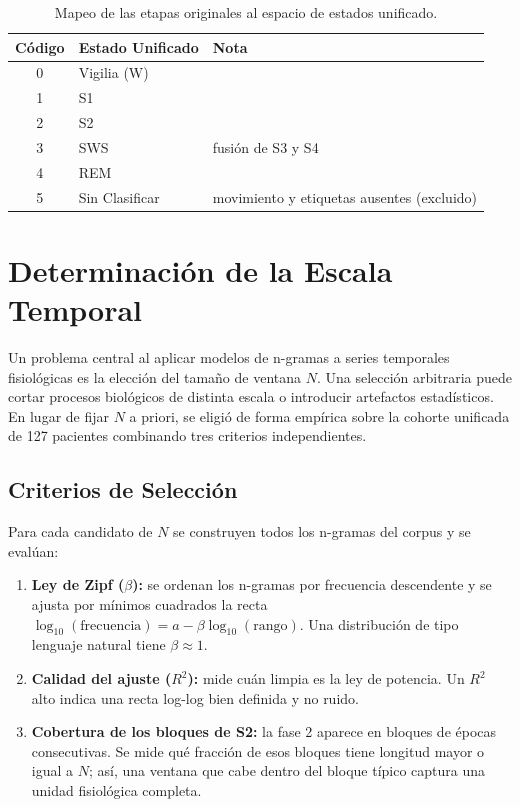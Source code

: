 \begin{table}[htbp]
\centering
\caption{Mapeo de las etapas originales al espacio de estados unificado.}
\label{tab:codificacion_simplificada}
\small\setlength{\tabcolsep}{5pt}%
\begin{tabular}{cll}
\hline
\textbf{Código} & \textbf{Estado Unificado} & \textbf{Nota} \\
\hline
0 & Vigilia (W) & \\
1 & S1 & \\
2 & S2 & \\
3 & SWS & fusión de S3 y S4 \\
4 & REM & \\
5 & Sin Clasificar & movimiento y etiquetas ausentes (excluido) \\
\hline
\end{tabular}
\end{table}

\section{Determinación de la Escala Temporal}

Un problema central al aplicar modelos de n-gramas a series temporales fisiológicas es la elección del tamaño de ventana $N$. Una selección arbitraria puede cortar procesos biológicos de distinta escala o introducir artefactos estadísticos. En lugar de fijar $N$ a priori, se eligió de forma empírica sobre la cohorte unificada de 127 pacientes combinando tres criterios independientes.

\subsection{Criterios de Selección}

Para cada candidato de $N$ se construyen todos los n-gramas del corpus y se evalúan:

\begin{enumerate}
    \item \textbf{Ley de Zipf ($\beta$):} se ordenan los n-gramas por frecuencia descendente y se ajusta por mínimos cuadrados la recta $\log_{10}(\text{frecuencia}) = a - \beta \log_{10}(\text{rango})$. Una distribución de tipo lenguaje natural tiene $\beta \approx 1$.
    \item \textbf{Calidad del ajuste ($R^2$):} mide cuán limpia es la ley de potencia. Un $R^2$ alto indica una recta log-log bien definida y no ruido.
    \item \textbf{Cobertura de los bloques de S2:} la fase 2 aparece en bloques de épocas consecutivas. Se mide qué fracción de esos bloques tiene longitud mayor o igual a $N$; así, una ventana que cabe dentro del bloque típico captura una unidad fisiológica completa.
\end{enumerate}

